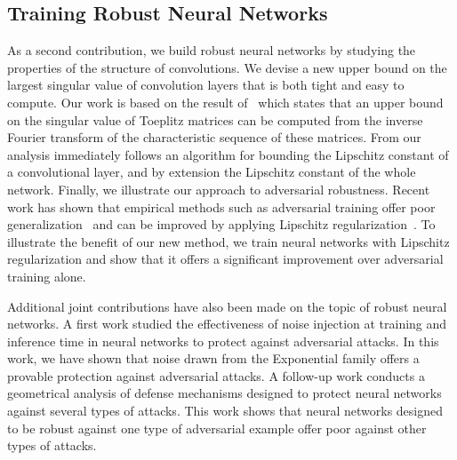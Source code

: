 


\subsection{Training Robust Neural Networks}
\label{subsection:ch1-training_robust_neural_networks}

As a second contribution, we build robust neural networks by studying the properties of the structure of convolutions.
We devise a new upper bound on the largest singular value of convolution layers that is both tight and easy to compute.
Our work is based on the result of~\citet{gray2006toeplitz} which states that an upper bound on the singular value of Toeplitz matrices can be computed from the inverse Fourier transform of the characteristic sequence of these matrices.
From our analysis immediately follows an algorithm for bounding the Lipschitz constant of a convolutional layer, and by extension the Lipschitz constant of the whole network.
Finally, we illustrate our approach to adversarial robustness.
Recent work has shown that empirical methods such as adversarial training offer poor generalization~\cite{schmidt2018adversarially} and can be improved by applying Lipschitz regularization~\cite{farnia2018generalizable}.
To illustrate the benefit of our new method, we train neural networks with Lipschitz regularization and show that it offers a significant improvement over adversarial training alone.

Additional joint contributions have also been made on the topic of robust neural networks.
A first work studied the effectiveness of noise injection at training and inference time in neural networks to protect against adversarial attacks.
In this work, we have shown that noise drawn from the Exponential family offers a provable protection against adversarial attacks. 
A follow-up work conducts a geometrical analysis of defense mechanisms designed to protect neural networks against several types of attacks.
This work shows that neural networks designed to be robust against one type of adversarial example offer poor against other types of attacks.


